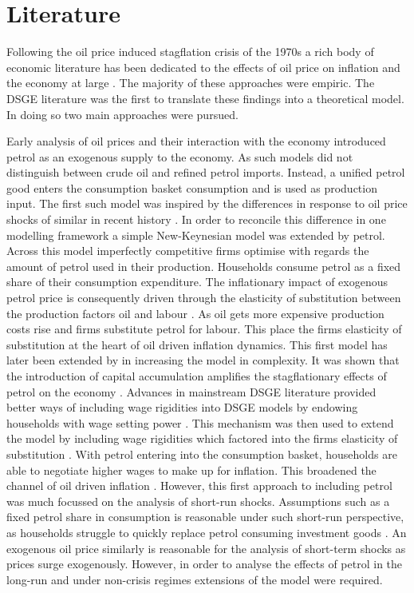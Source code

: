 \documentclass[12pt,a4paper,english]{article} %
\let\oldsection\section
\renewcommand\section{\clearpage\oldsection}
\begin{document}
	\section{Literature}
	
	Following the oil price induced stagflation crisis of the 1970s a rich body of economic literature has been dedicated to the effects of oil price on inflation and the economy at large \cite{barsky_oil_2002, bernanke_systematic_1997}. The majority of these approaches were empiric. The DSGE literature was the first to translate these findings into a theoretical model. In doing so two main approaches were pursued.
	
	Early analysis of oil prices and their interaction with the economy introduced petrol as an exogenous supply to the economy. As such models did not distinguish between crude oil and refined petrol imports. Instead, a unified petrol good enters the consumption basket consumption and is used as production input. The first such model was inspired by the differences in response to oil price shocks of similar in recent history \cite{macroeconomic_2007}. In order to reconcile this difference in one modelling framework a simple New-Keynesian model was extended by petrol. Across this model imperfectly competitive firms optimise with regards the amount of petrol used in their production. Households consume petrol as a fixed share of their consumption expenditure. The inflationary impact of exogenous petrol price is consequently driven through the elasticity of substitution between the production factors oil and labour \cite{blanchard_macroeconomic_2007}. As oil gets more expensive production costs rise and firms substitute petrol for labour. This place the firms elasticity of substitution at the heart of oil driven inflation dynamics. This first model has later been extended by in increasing the model in complexity. It was shown that the introduction of capital accumulation amplifies the stagflationary effects of petrol on the economy \cite{vasconez_what_nodate}. Advances in mainstream DSGE literature provided better ways of including wage rigidities into DSGE models by endowing households with wage setting power \cite{smets_shocks_2007}. This mechanism was then used to extend the model by including wage rigidities which factored into the firms elasticity of substitution \cite{leduc_quantitative_2004}. With petrol entering into the consumption basket, households are able to negotiate higher wages to make up for inflation. This broadened the channel of oil driven inflation \cite{leduc_quantitative_2004}.	However, this first approach to including petrol was much focussed on the analysis of short-run shocks. Assumptions such as a fixed petrol share in consumption is reasonable under such short-run perspective, as households struggle to quickly replace petrol consuming investment goods \cite{blanchard_macroeconomic_2007}. An exogenous oil price similarly is reasonable for the analysis of short-term shocks as prices surge exogenously. However, in order to analyse the effects of petrol in the long-run and under non-crisis regimes extensions of the model were required.\\
	
\end{document}
